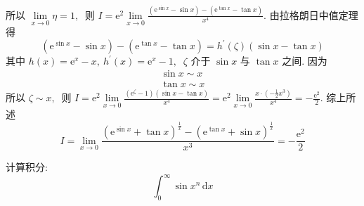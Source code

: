 \begin{solution}
$$\begin{array}{l}
		\end{array}$$
		所以 $ \lim\limits_{x \rightarrow 0} \eta=1 ,\ $ 则  $I=\mathrm{e}^{2} \lim\limits_{x \rightarrow 0} \frac{\left(\mathrm{e}^{\sin x}-\sin x\right)-\left(\mathrm{e}^{\tan x}-\tan x\right)}{x^{4}} .$
		由拉格朗日中值定理得
		$$\left(\mathrm{e}^{\sin x}-\sin x\right)-\left(\mathrm{e}^{\tan x}-\tan x\right)=h^{\prime}(\zeta)(\sin x-\tan x)$$
		其中  $h(x)=\mathrm{e}^{x}-x,\  h^{\prime}(x)=\mathrm{e}^{x}-1,\ $ $\zeta$  介于  $\sin x $ 与  $\tan x $ 之间.
		因为
		$$\begin{array}{l}
			\sin x \sim x \\
			\tan x \sim x
		\end{array}$$
		所以  $\zeta \sim x ,\ $ 则 $ I=\mathrm{e}^{2} \lim\limits_{x \rightarrow 0} \frac{\left(\mathrm{e}^{\zeta}-1\right)(\sin x-\tan x)}{x^{4}}=\mathrm{e}^{2} \lim\limits_{x \rightarrow 0} \frac{x \cdot\left(-\frac{1}{2} x^{3}\right)}{x^{4}}=-\frac{\mathrm{e}^{2}}{2} .$ 综上所述
		$$I=\lim\limits _{x \rightarrow 0} \frac{\left(\mathrm{e}^{\sin x}+\tan x\right)^{\frac{1}{x}}-\left(\mathrm{e}^{\tan x}+\sin x\right)^{\frac{1}{x}}}{x^{3}}=-\frac{\mathrm{e}^{2}}{2}$$ 
	\end{solution}
	\newpage
	\begin{problem}
		计算积分:
		$$\int_{0}^{\infty}\sin x^n\,\mathrm{d}x$$
	\end{problem}

